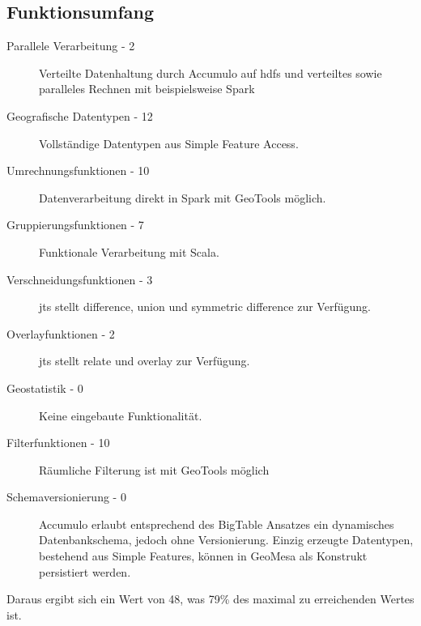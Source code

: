 \subsection{Funktionsumfang}
\begin{description}
\item[Parallele Verarbeitung - 2] Verteilte Datenhaltung durch Accumulo auf \Gls{hdfs} und verteiltes sowie paralleles Rechnen mit beispielsweise Spark \cite{website:geomesaeclipse}
\item[Geografische Datentypen - 12] Vollständige Datentypen aus Simple Feature Access. \cite{website:geomesaeclipse}
\item[Umrechnungsfunktionen - 10] Datenverarbeitung direkt in Spark mit GeoTools möglich. \cite{website:geotools-crs}
\item[Gruppierungsfunktionen - 7] Funktionale Verarbeitung mit Scala.
\item[Verschneidungsfunktionen - 3] \Gls{jts} stellt difference, union und symmetric difference zur Verfügung. \cite{website:jts-wikipedia}
\item[Overlayfunktionen - 2] \Gls{jts} stellt relate und overlay zur Verfügung.
\item[Geostatistik - 0] Keine eingebaute Funktionalität.
\item[Filterfunktionen - 10] Räumliche Filterung ist  mit GeoTools möglich \cite{website:geotools-wiki}
\item[Schemaversionierung - 0] Accumulo erlaubt entsprechend des BigTable Ansatzes ein dynamisches Datenbankschema, jedoch ohne Versionierung. Einzig erzeugte Datentypen, bestehend aus Simple Features, können in GeoMesa als Konstrukt persistiert werden.
\end{description}
Daraus ergibt sich ein Wert von 48, was 79\% des maximal zu erreichenden Wertes ist.

